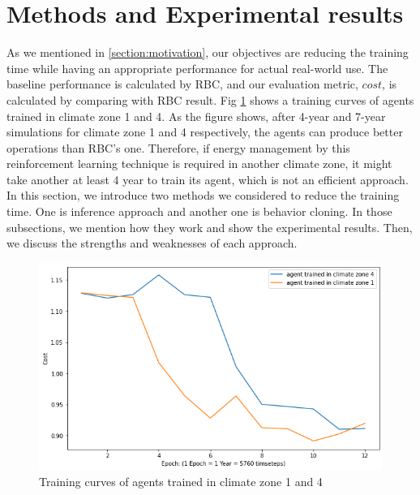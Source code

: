 \documentclass{article}
\begin{document}
\section{Methods and Experimental results}
As we mentioned in \ref{section:motivation}, our objectives are reducing the training time while having an appropriate performance for actual real-world use. The baseline performance is calculated by RBC, and our evaluation metric, $cost$, is calculated by comparing with RBC result. Fig \ref{fig:replication_result} shows a training curves of agents trained in climate zone 1 and 4. As the figure shows, after 4-year and 7-year simulations for climate zone 1 and 4 respectively, the agents can produce better operations than RBC's one. Therefore, if energy management by this reinforcement learning technique is required in another climate zone, it might take another at least 4 year to train its agent, which is not an efficient approach. In this section, we introduce two methods we considered to reduce the training time. One is inference approach and another one is behavior cloning. In those subsections, we mention how they work and show the experimental results. Then, we discuss the strengths and weaknesses of each approach.

\begin{figure}[h!]
\centering
\label{fig:replication_result}
\includegraphics[scale=0.4]{figures/replication_result.png}
\caption{Training curves of agents trained in climate zone 1 and 4}
\end{figure}
\end{document}
